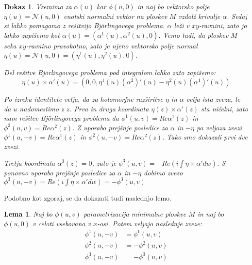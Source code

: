 \documentclass{article}
\newtheorem{lema}{Lema}
\newtheorem{dokaz}{Dokaz}
\begin{document}
        \begin{dokaz}
            Vzemimo za $\alpha(u)$ kar $\phi (u, 0)$ in naj bo vektorsko polje $\eta (u) = \mathcal{N} (u, 0)$ enotski normalni 
            vektor na ploskev $M$ vzdolž krivulje $\alpha$. Sedaj si lahko pomagamo z rešitvijo Björlingovega problema.
            $\alpha$ leži v $xy$-ravnini, zato jo lahko zapišemo kot $\alpha (u) = \left( \alpha^{1} (u), \alpha^{2} (u), 0 \right)$.
            Vemo tudi, da ploskev $M$ seka $xy$-ravnino pravokotno, zato je njeno vektorsko polje normal
            $\eta (u) = \mathcal{N} (u, 0) = \left( \eta^{1} (u), \eta^{2} (u), 0 \right)$.
        
            Del rešitve Björlingovega problema pod integralom lahko zato zapišemo:
            $$ \eta (u) \times \alpha' (u) = \left( 0, 0, \eta^1 (u) (\alpha^2)' (u) - \eta^2 (u) (\alpha^1)' (u) \right) $$
        
            Po izreku identitete velja, da za holomorfne razširitve $\eta$ in $\alpha$ velja ista zveza, le da $u$ nadomestimo z $z$.
            Prva in druga koordinata $\eta (z) \times \alpha' (z)$ sta ničelni, zato nam rešitev Björlingovega problema da 
            $\phi^{1} (u, v) = Re \alpha^{1} (z)$ in $\phi^{2} (u, v) = Re \alpha^{2} (z)$. Z uporabo prejšnje posledice za $\alpha$
            in $- \eta$ pa veljaza zvezi $\phi^{1} (u, - v) = Re \alpha^{1} (z)$ in $\phi^{2} (u, - v) = Re \alpha^{2} (z)$.
            Tako smo dokazali prvi dve zvezi.
        
            Tretja koordinata $\alpha^{3} (z) = 0$, zato je $ \phi^{3} (u, v) = - Re \left( i \int \eta \times \alpha' dw \right) $.
            S ponovno uporabo prejšnje posledice za $\alpha$ in $- \eta$ dobimo zvezo 
            $ \phi^{3} (u, - v) = Re \left( i \int \eta \times \alpha' dw \right) = - \phi^{3} (u, v) $
        \end{dokaz}


        Podobno kot zgoraj, se da dokazati tudi naslednjo lemo.

        \begin{lema}
            Naj bo $\phi (u, v)$ parametrizacija minimalne ploskve $M$ in naj bo $\phi (u, 0)$ v celoti vsebovana v $x$-osi.
            Potem veljajo naslednje zveze:
            \begin{align*}
                \phi^{1} (u, - v) &= \phi^{1} (u, v) \\
                \phi^{2} (u, - v) &= - \phi^{2} (u, v) \\
                \phi^{3} (u, - v) &= - \phi^{3} (u, v) \\ 
            \end{align*}
        \end{lema}
\end{document}
